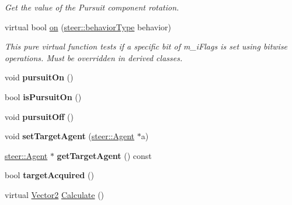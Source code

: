 \begin{DoxyCompactItemize}
\begin{DoxyCompactList}\small\item\em Get the value of the Pursuit component rotation. \end{DoxyCompactList}\item 
virtual bool \hyperlink{classsteer_1_1_pursuit_component_a10e4d08aaca8aaf3d7041e281af2a519}{on} (\hyperlink{namespacesteer_afe6e72f8f8088962727051501181acbe}{steer\-::behavior\-Type} behavior)
\begin{DoxyCompactList}\small\item\em This pure virtual function tests if a specific bit of m\-\_\-i\-Flags is set using bitwise operations. Must be overridden in derived classes. \end{DoxyCompactList}\item 
\hypertarget{classsteer_1_1_pursuit_component_a02a94c1423b71b2c0dc017a42f9b9dff}{void {\bfseries pursuit\-On} ()}\label{classsteer_1_1_pursuit_component_a02a94c1423b71b2c0dc017a42f9b9dff}

\item 
\hypertarget{classsteer_1_1_pursuit_component_ae116f09357ae520ae625b8bdfb465167}{bool {\bfseries is\-Pursuit\-On} ()}\label{classsteer_1_1_pursuit_component_ae116f09357ae520ae625b8bdfb465167}

\item 
\hypertarget{classsteer_1_1_pursuit_component_a2046b1952c056a46287f7f7982d115e8}{void {\bfseries pursuit\-Off} ()}\label{classsteer_1_1_pursuit_component_a2046b1952c056a46287f7f7982d115e8}

\item 
\hypertarget{classsteer_1_1_pursuit_component_a6c1246c5310b182fcb033940dbb2c9ff}{void {\bfseries set\-Target\-Agent} (\hyperlink{classsteer_1_1_agent}{steer\-::\-Agent} $\ast$a)}\label{classsteer_1_1_pursuit_component_a6c1246c5310b182fcb033940dbb2c9ff}

\item 
\hypertarget{classsteer_1_1_pursuit_component_af9a95fbf5c379e32fdcff933d32def99}{\hyperlink{classsteer_1_1_agent}{steer\-::\-Agent} $\ast$ {\bfseries get\-Target\-Agent} () const }\label{classsteer_1_1_pursuit_component_af9a95fbf5c379e32fdcff933d32def99}

\item 
\hypertarget{classsteer_1_1_pursuit_component_ab0d9dca749f1a2474264b01badfd5fa2}{bool {\bfseries target\-Acquired} ()}\label{classsteer_1_1_pursuit_component_ab0d9dca749f1a2474264b01badfd5fa2}

\item 
\hypertarget{classsteer_1_1_pursuit_component_a644fa669d584d925b4c888bf67119045}{virtual \hyperlink{structsteer_1_1_vector2}{Vector2} \hyperlink{classsteer_1_1_pursuit_component_a644fa669d584d925b4c888bf67119045}{Calculate} ()}\label{classsteer_1_1_pursuit_component_a644fa669d584d925b4c888bf67119045}


\end{DoxyCompactItemize}
